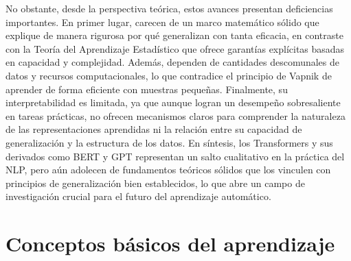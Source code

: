\documentclass{report}
\begin{document}
No obstante, desde la perspectiva teórica, estos avances presentan deficiencias importantes. En primer lugar, carecen de un marco matemático sólido que explique de manera rigurosa por qué generalizan con tanta eficacia, en contraste con la Teoría del Aprendizaje Estadístico que ofrece garantías explícitas basadas en capacidad y complejidad. Además, dependen de cantidades descomunales de datos y recursos computacionales, lo que contradice el principio de Vapnik de aprender de forma eficiente con muestras pequeñas. Finalmente, su interpretabilidad es limitada, ya que aunque logran un desempeño sobresaliente en tareas prácticas, no ofrecen mecanismos claros para comprender la naturaleza de las representaciones aprendidas ni la relación entre su capacidad de generalización y la estructura de los datos. 
En síntesis, los Transformers y sus derivados como BERT y GPT representan un salto cualitativo en la práctica del NLP, pero aún adolecen de fundamentos teóricos sólidos que los vinculen con principios de generalización bien establecidos, lo que abre un campo de investigación crucial para el futuro del aprendizaje automático.



\section{Conceptos básicos del aprendizaje}
\end{document}

